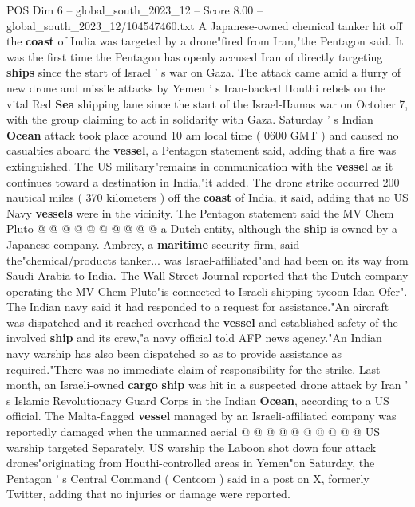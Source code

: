 \begin{textsample}{POS Dim 6 – global\_south\_2023\_12 – Score 8.00 – global\_south\_2023\_12/104547460.txt}  \label{ex:f6_pos_126}
A Japanese-owned chemical tanker hit off the \textbf{coast} of India was targeted by a drone"fired from Iran,"the Pentagon said.
It was the first time the Pentagon has openly accused Iran of directly targeting \textbf{ships} since the start of Israel ' s war on Gaza.
The attack came amid a flurry of new drone and missile attacks by Yemen ' s Iran-backed Houthi rebels on the vital Red \textbf{Sea} shipping lane since the start of the Israel-Hamas war on October 7, with the group claiming to act in solidarity with Gaza.
Saturday ' s Indian \textbf{Ocean} attack took place around 10 am local time ( 0600 GMT ) and caused no casualties aboard the \textbf{vessel}, a Pentagon statement said, adding that a fire was extinguished.
The US military"remains in communication with the \textbf{vessel} as it continues toward a destination in India,"it added.
The drone strike occurred 200 nautical miles ( 370 kilometers ) off the \textbf{coast} of India, it said, adding that no US Navy \textbf{vessels} were in the vicinity.
The Pentagon statement said the MV Chem Pluto @ @ @ @ @ @ @ @ @ @ a Dutch entity, although the \textbf{ship} is owned by a Japanese company.
Ambrey, a \textbf{maritime} security firm, said the"chemical/products tanker... was Israel-affiliated"and had been on its way from Saudi Arabia to India.
The Wall Street Journal reported that the Dutch company operating the MV Chem Pluto"is connected to Israeli shipping tycoon Idan Ofer".
The Indian navy said it had responded to a request for assistance."An aircraft was dispatched and it reached overhead the \textbf{vessel} and established safety of the involved \textbf{ship} and its crew,"a navy official told AFP news agency."An Indian navy warship has also been dispatched so as to provide assistance as required."There was no immediate claim of responsibility for the strike.
Last month, an Israeli-owned \textbf{cargo} \textbf{ship} was hit in a suspected drone attack by Iran ' s Islamic Revolutionary Guard Corps in the Indian \textbf{Ocean}, according to a US official.
The Malta-flagged \textbf{vessel} managed by an Israeli-affiliated company was reportedly damaged when the unmanned aerial @ @ @ @ @ @ @ @ @ @ US warship targeted Separately, US warship the Laboon shot down four attack drones"originating from Houthi-controlled areas in Yemen"on Saturday, the Pentagon ' s Central Command ( Centcom ) said in a post on X, formerly Twitter, adding that no injuries or damage were reported.

\end{textsample}
